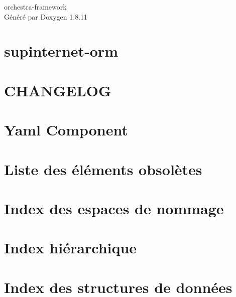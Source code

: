 \documentclass[twoside]{book}
\newcommand{\+}{\discretionary{\mbox{\scriptsize$\hookleftarrow$}}{}{}}
\newcommand{\clearemptydoublepage}{%
  \newpage{\pagestyle{empty}\cleardoublepage}%
}
\begin{document}
\hypersetup{pageanchor=false,
             bookmarksnumbered=true,
             pdfencoding=unicode
            }
\begin{titlepage}
\vspace*{7cm}
\begin{center}%
{\Large orchestra-\/framework }\\
\vspace*{1cm}
{\large Généré par Doxygen 1.8.11}\\
\end{center}
\end{titlepage}
\clearemptydoublepage
\tableofcontents
\clearemptydoublepage
{}
\hypersetup{pageanchor=true}

\chapter{supinternet-\/orm}
\label{md_vendor_droxyum_supinternet-orm_README}
\hypertarget{md_vendor_droxyum_supinternet-orm_README}{}

\chapter{C\+H\+A\+N\+G\+E\+L\+OG}
\label{md_vendor_symfony_yaml_CHANGELOG}
\hypertarget{md_vendor_symfony_yaml_CHANGELOG}{}

\chapter{Yaml Component}
\label{md_vendor_symfony_yaml_README}
\hypertarget{md_vendor_symfony_yaml_README}{}

\chapter{Liste des éléments obsolètes}
\label{deprecated}
\hypertarget{deprecated}{}

\chapter{Index des espaces de nommage}

\chapter{Index hiérarchique}

\chapter{Index des structures de données}

\end{document}
